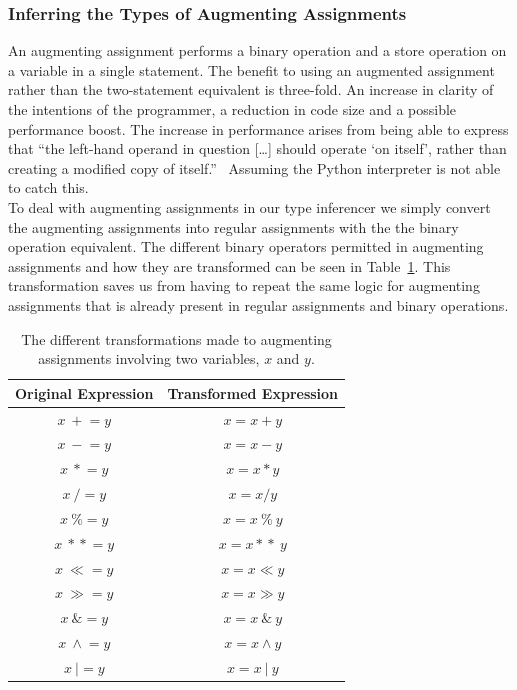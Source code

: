 \documentclass[12pt, titlepage]{article}
\begin{document}
\subsubsection{Inferring the Types of Augmenting Assignments}
An augmenting assignment performs a binary operation and a store operation on a variable in a single statement. The benefit to using an augmented assignment rather than the two-statement equivalent is three-fold. An increase in clarity of the intentions of the programmer, a reduction in code size and a possible performance boost. The increase in performance arises from being able to express that ``the left-hand operand in question [\ldots] should operate `on itself', rather than creating a modified copy of itself.''~\cite{pepAugAssign} Assuming the Python interpreter is not able to catch this. \\
To deal with augmenting assignments in our type inferencer we simply convert the augmenting assignments into regular assignments with the the binary operation equivalent. The different binary operators permitted in augmenting assignments and how they are transformed can be seen in Table~\ref{table:augAssign}. This transformation saves us from having to repeat the same logic for augmenting assignments that is already present in regular assignments and binary operations.

	\begin{table}
	\centering
    \begin{tabular}{ | c | c |}
    \hline
    \textbf{Original Expression} & \textbf{Transformed Expression}  \\ \hline
    $x \: +\!= y$ & $x = x + y$   \\ \hline
    $x \: -\!= y$ & $x = x - y$   \\ \hline
    $x \: *\!= y$ & $x = x * y$   \\ \hline
    $x \: /\!= y$ & $x = x / y$   \\ \hline
    $x \: \%\!= y$ & $x = x \: \% \: y$   \\ \hline
    $x \: *\!*\!= y$ & $x = x *\!* \: y$   \\ \hline
    $x \: \ll = y$ & $x = x \ll y$   \\ \hline
    $x \: \gg = y$ & $x = x \gg y$   \\ \hline
    $x \: \&\!= y$ & $x = x \: \& \: y$   \\ \hline
    $x \: \wedge\!= y$ & $x = x \wedge y$   \\ \hline
    $x \: |= y$ & $x = x \: | \: y$   \\ \hline
    \end{tabular}
    \caption{The different transformations made to augmenting assignments involving two variables, $x$ and $y$.}
	\label{table:augAssign}
    \end{table}
\end{document}

